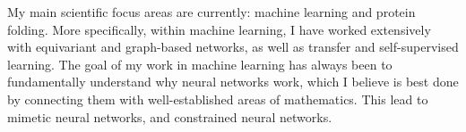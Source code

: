 


My main scientific focus areas are currently: machine learning and protein folding. More specifically, within machine learning, I have worked extensively with equivariant and graph-based networks, as well as transfer and self-supervised learning. The goal of my work in machine learning has always been to fundamentally understand why neural networks work, which I believe is best done by connecting them with well-established areas of mathematics. This lead to mimetic neural networks, and constrained neural networks.

